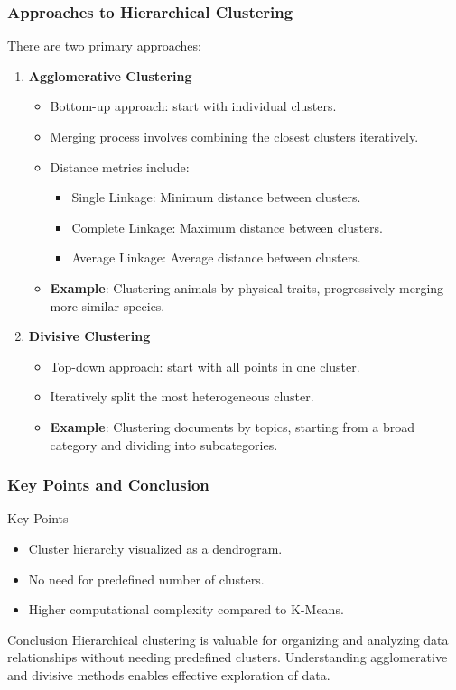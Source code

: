 \documentclass[aspectratio=169]{beamer}
\begin{document}
\begin{frame}[fragile]
    \frametitle{Approaches to Hierarchical Clustering}
    There are two primary approaches: 
    \begin{enumerate}
        \item \textbf{Agglomerative Clustering}
        \begin{itemize}
            \item Bottom-up approach: start with individual clusters.
            \item Merging process involves combining the closest clusters iteratively.
            \item Distance metrics include:
            \begin{itemize}
                \item Single Linkage: Minimum distance between clusters.
                \item Complete Linkage: Maximum distance between clusters.
                \item Average Linkage: Average distance between clusters.
            \end{itemize}
            \item \textbf{Example}: Clustering animals by physical traits, progressively merging more similar species.
        \end{itemize}
        
        \item \textbf{Divisive Clustering}
        \begin{itemize}
            \item Top-down approach: start with all points in one cluster.
            \item Iteratively split the most heterogeneous cluster.
            \item \textbf{Example}: Clustering documents by topics, starting from a broad category and dividing into subcategories.
        \end{itemize}
    \end{enumerate}
\end{frame}

\begin{frame}[fragile]
    \frametitle{Key Points and Conclusion}
    \begin{block}{Key Points}
        \begin{itemize}
            \item Cluster hierarchy visualized as a dendrogram.
            \item No need for predefined number of clusters.
            \item Higher computational complexity compared to K-Means.
        \end{itemize}
    \end{block}
    
    \begin{block}{Conclusion}
        Hierarchical clustering is valuable for organizing and analyzing data relationships without needing predefined clusters. Understanding agglomerative and divisive methods enables effective exploration of data.
    \end{block}
\end{frame}
\end{document}

